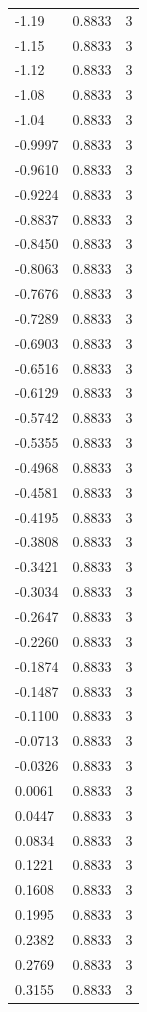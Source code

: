 \begin{longtable}{lrr}
  -1.19 & 0.8833 & 3 \\
  -1.15 & 0.8833 & 3 \\
  -1.12 & 0.8833 & 3 \\
  -1.08 & 0.8833 & 3 \\
  -1.04 & 0.8833 & 3 \\
  -0.9997 & 0.8833 & 3 \\
  -0.9610 & 0.8833 & 3 \\
  -0.9224 & 0.8833 & 3 \\
  -0.8837 & 0.8833 & 3 \\
  -0.8450 & 0.8833 & 3 \\
  -0.8063 & 0.8833 & 3 \\
  -0.7676 & 0.8833 & 3 \\
  -0.7289 & 0.8833 & 3 \\
  -0.6903 & 0.8833 & 3 \\
  -0.6516 & 0.8833 & 3 \\
  -0.6129 & 0.8833 & 3 \\
  -0.5742 & 0.8833 & 3 \\
  -0.5355 & 0.8833 & 3 \\
  -0.4968 & 0.8833 & 3 \\
  -0.4581 & 0.8833 & 3 \\
  -0.4195 & 0.8833 & 3 \\
  -0.3808 & 0.8833 & 3 \\
  -0.3421 & 0.8833 & 3 \\
  -0.3034 & 0.8833 & 3 \\
  -0.2647 & 0.8833 & 3 \\
  -0.2260 & 0.8833 & 3 \\
  -0.1874 & 0.8833 & 3 \\
  -0.1487 & 0.8833 & 3 \\
  -0.1100 & 0.8833 & 3 \\
  -0.0713 & 0.8833 & 3 \\
  -0.0326 & 0.8833 & 3 \\
  0.0061 & 0.8833 & 3 \\
  0.0447 & 0.8833 & 3 \\
  0.0834 & 0.8833 & 3 \\
  0.1221 & 0.8833 & 3 \\
  0.1608 & 0.8833 & 3 \\
  0.1995 & 0.8833 & 3 \\
  0.2382 & 0.8833 & 3 \\
  0.2769 & 0.8833 & 3 \\
  0.3155 & 0.8833 & 3 \\

\end{longtable}
